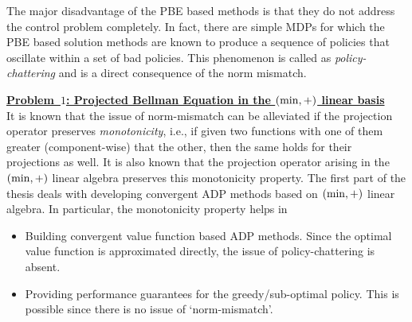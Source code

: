 The major disadvantage of the PBE based methods is that they do not address the control problem completely. In fact, there are simple MDPs for which the PBE based solution methods are known to produce a sequence of policies that oscillate within a set of bad policies. This phenomenon is called as \emph{policy-chattering} and is a direct consequence of the norm mismatch.\par
\textbf{\underline{Problem~$1$: Projected Bellman Equation in the $(\min,+)$ linear basis}}\\
It is known that \cite{BertB} the issue of norm-mismatch can be alleviated if the projection operator preserves \emph{monotonicity}, i.e., if given two functions with one of them greater (component-wise) that the other, then the same holds for their projections as well. It is also known that the projection operator arising in the $(\min,+)$ linear algebra preserves this monotonicity property. The first part of the thesis deals with developing convergent ADP methods based on $(\min,+)$ linear algebra. In particular, the monotonicity property helps in
\begin{itemize}
\item Building convergent value function based ADP methods. Since the optimal value function is approximated directly, the issue of policy-chattering is absent.
\item Providing performance guarantees for the greedy/sub-optimal policy. This is possible since there is no issue of `norm-mismatch'.
\end{itemize}
